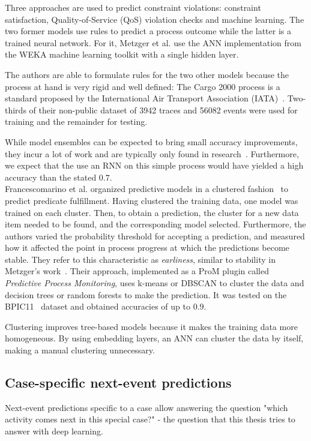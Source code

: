 Three approaches are used to predict constraint violations: constraint satisfaction, Quality-of-Service (QoS) violation checks and machine learning. The two former models use rules to predict a process outcome while the latter is a trained neural network. For it, Metzger et al. use the ANN implementation from the WEKA machine learning toolkit with a single hidden layer.

The authors are able to formulate rules for the two other models because the process at hand is very rigid and well defined: The Cargo 2000 process is a standard proposed by the International Air Transport Association (IATA)~\cite{metzger2015}. Two-thirds of their non-public dataset of 3942 traces and 56082 events were used for training and the remainder for testing.

While model ensembles can be expected to bring small accuracy improvements, they incur a lot of work and are typically only found in research~\cite{lessmannBADS}. Furthermore, we expect that the use an RNN on this simple process would have yielded a high accuracy than the stated $0.7$.\\

Francescomarino et al. organized predictive models in a clustered fashion~\cite{francescomarino2015} to predict predicate fulfillment. Having clustered the training data, one model was trained on each cluster. Then, to obtain a prediction, the cluster for a new data item needed to be found, and the corresponding model selected. Furthermore, the authors varied the probability threshold for accepting a prediction, and measured how it affected the point in process progress at which the predictions become stable. They refer to this characteristic as \textit{earliness}, similar to stability in Metzger's work~\cite{metzger2015}. Their approach, implemented as a ProM plugin called \textit{Predictive Process Monitoring}, uses k-means or DBSCAN to cluster the data and decision trees or random forests to make the prediction. It was tested on the BPIC11~\cite{BPIC2011} dataset and obtained accuracies of up to $0.9$.

Clustering improves tree-based models because it makes the training data more homogeneous. By using embedding layers, an ANN can cluster the data by itself, making a manual clustering unnecessary.

\subsection*{Case-specific next-event predictions}
Next-event predictions specific to a case allow answering the question "which activity comes next in this special case?" - the question that this thesis tries to answer with deep learning.\\

